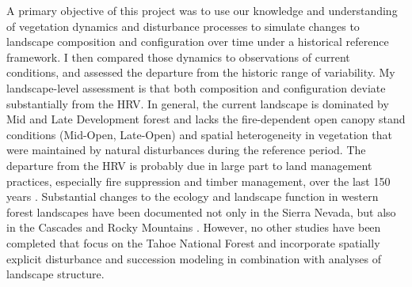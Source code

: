 

A primary objective of this project was to use our knowledge and understanding of vegetation dynamics and disturbance processes to simulate changes to landscape composition and configuration over time under a historical reference framework. I then compared those dynamics to observations of current conditions, and assessed the departure from the historic range of variability. My landscape-level assessment is that both composition and configuration deviate substantially from the HRV. In general, the current landscape is dominated by Mid and Late Development forest and lacks the fire-dependent open canopy stand conditions (Mid-Open, Late-Open) and spatial heterogeneity in vegetation that were maintained by natural disturbances during the reference period. The departure from the HRV is probably due in large part to land management practices, especially fire suppression and timber management, over the last 150 years \citep{Safford2014,Stephens2007}. Substantial changes to the ecology and landscape function in western forest landscapes have been documented not only in the Sierra Nevada, but also in the Cascades and Rocky Mountains \citep{Hessburg2005,Baker2012,Baker2014,Mallek2013,Agee1993}. However, no other studies have been completed that focus on the Tahoe National Forest and incorporate spatially explicit disturbance and succession modeling in combination with analyses of landscape structure.

